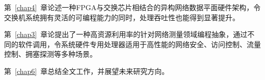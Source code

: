 第~\ref{chap4}~章论述一种FPGA与交换芯片相结合的异构网络数据平面硬件架构，令交换机系统拥有灵活的可编程能力的同时，处理吞吐性也能得到显著提升。

第~\ref{chap3}~章论提出了一种高资源利用率的针对网络测量领域编程抽象，通过不同的软件调用，令系统硬件专用处理器适用于高性能的网络安全、访问控制、流量控制、拥塞探测等多种场景。

第~\ref{chap6}~章总结全文工作，并展望未来研究方向。






































